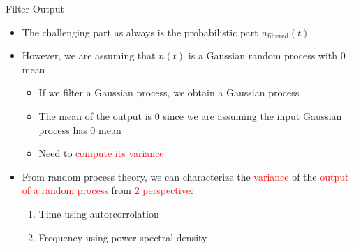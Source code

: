 \documentclass{Beamer}
\begin{document}
\begin{frame}[t,allowframebreaks]{Filter Output}
\begin{itemize}
\newpage 

\item The challenging part as always is the probabilistic part $ n_{\text{filtered}}(t)$

\item However, we are assuming that $n(t)$ is a Gaussian random process with 0 mean

	\begin{itemize}
	\item If we filter a Gaussian process, we obtain a Gaussian process
	
	\item The mean of the output is 0 since we are assuming the input Gaussian process has 0 mean
	
	\item Need to \textcolor{red}{compute its variance}
	\end{itemize}
  
\item From random process theory, we can characterize the \textcolor{red}{variance} of the \textcolor{red}{output of a random process} from  \textcolor{red}{2 perspective}: 

	\begin{enumerate}
	\item Time using autorcorrolation
	
	\item Frequency using power spectral density
	\end{enumerate} 
 
 
\end{itemize}

\end{frame}
\end{document}
